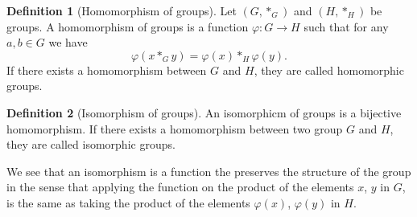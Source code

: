 \documentclass[11pt,a4paper]{article}
\theoremstyle{definition}
\newtheorem{definition}{Definition}[section]
\theoremstyle{plain}
\begin{document}
  \begin{definition}[Homomorphism of groups]
    Let $(G,*_G)$ and $(H,*_H)$ be groups.
    A homomorphism of groups is a function $\varphi \colon G \to H$ such
    that for any $a, b \in G$ we have
    \[
      \varphi(x *_G y) = \varphi(x) *_H \varphi(y).
    \]
    If there exists a homomorphism between $G$ and $H$, they are called
    homomorphic groups.
  \end{definition}

  \begin{definition}[Isomorphism of groups]
    An isomorphicm of groups is a bijective homomorphism.
    If there exists a homomorphism between two group $G$ and $H$,
    they are called isomorphic groups.
  \end{definition}

  We see that an isomorphism is a function the preserves the structure
  of the group in the sense that applying the function on the product 
  of the elements $x$, $y$ in $G$, is the same as taking the product of 
  the elements $\varphi(x)$, $\varphi(y)$ in $H$.
\end{document}
